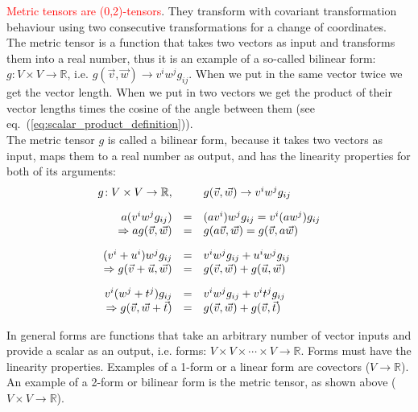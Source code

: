 \textcolor{red}{Metric tensors are (0,2)-tensors}. They transform with covariant
transformation behaviour using two consecutive transformations for a change of
coordinates. \\

The metric tensor is a function that takes two vectors as input and transforms them into a
real number, thus it is an example of a so-called bilinear form: $g\!: V \times V
\rightarrow \mathbb{R}$, i.e. $g(\vec{v},\vec{w}) \rightarrow v^i w^j g_{ij}$. When we put
in the same vector twice we get the vector length. When we put in two vectors we get the
product of their vector lengths times the cosine of the angle between them (see
eq.~(\ref{eq:scalar_product_definition})). \\

The metric tensor $g$ is called a bilinear form, because it takes two vectors as input,
maps them to a real number as output, and has the linearity properties for both of its
arguments:
\begin{equation}
    \label{eq:metric_tensor_linearity_properties}
    \begin{array}{rcl}
        g\!: V \times V \rightarrow \mathbb{R},&&
        g(\vec{v},\vec{w}) \rightarrow v^i w^j g_{ij} \\
        \noalign{\vskip10pt}
        a(v^i w^j g_{ij}) &=& (av^i) w^j g_{ij} = v^i (aw^j) g_{ij} \\
        \Rightarrow ag(\vec{v},\vec{w}) &=& g(a\vec{v},\vec{w}) = g(\vec{v},a\vec{w}) \\
        \noalign{\vskip10pt}
        (v^i + u^i) w^j g_{ij} &=& v^i w^j g_{ij} + u^i w^j g_{ij} \\
        \Rightarrow g(\vec{v}+\vec{u},\vec{w}) &=& g(\vec{v},\vec{w}) + g(\vec{u},\vec{w}) \\
        \noalign{\vskip10pt}
        v^i (w^j + t^j) g_{ij} &=& v^i w^j g_{ij} + v^i t^j g_{ij} \\
        \Rightarrow g(\vec{v},\vec{w}+\vec{t}) &=& g(\vec{v},\vec{w}) + g(\vec{v},\vec{t})
    \end{array}
\end{equation}

In general forms are functions that take an arbitrary number of vector inputs and provide
a scalar as an output, i.e. forms: $V \times V \times \cdots \times V \rightarrow
\mathbb{R}$. Forms must have the linearity properties. Examples of a 1-form or a linear form
are covectors ($V \rightarrow \mathbb{R}$). An example of a 2-form or bilinear form is the
metric tensor, as shown above ($V \times V \rightarrow \mathbb{R}$). \\

